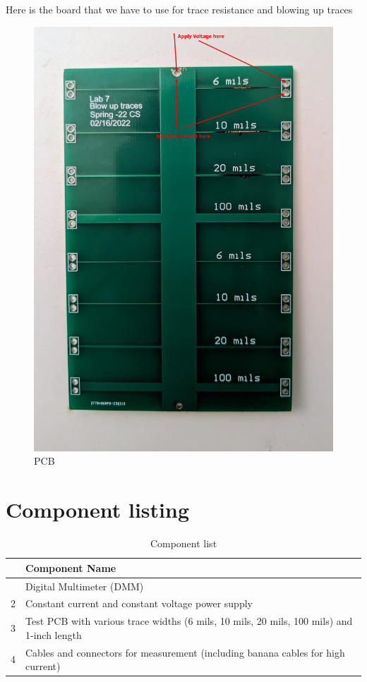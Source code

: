 \documentclass[a4paper,11pt]{article}%
\begin{document}
\begin{itemize}
	Here is the board that we have to use for trace resistance and blowing up traces
	\begin{figure}[!h]
		\centering
		\includegraphics[scale=0.12]{figures/4wire}
		\caption{PCB}

	\end{figure}
	
\end{itemize}


\section{Component listing}


\begin{table}[H]
	\centering 
	\begin{tabular}{|c|l|}
		\hline
		&\textbf{Component Name}\\\hline
		\cr
		1&Digital Multimeter (DMM)\\
		2&Constant current and constant voltage power supply\\
3&Test PCB with various trace widths (6 mils, 10 mils, 20 mils, 100 mils) and 1-inch length\\
4&Cables and connectors for measurement (including banana cables for high current)\\
\hline\hline
	\end{tabular}
	\caption{Component list}
	\label{filterspecs}
\end{table}
\end{document}
